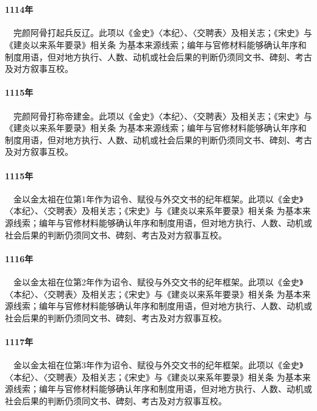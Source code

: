 \section{}

\paragraph{1114年}　完颜阿骨打起兵反辽。此项以《金史》〈本纪〉、〈交聘表〉及相关志；《宋史》与《建炎以来系年要录》相关条 为基本来源线索；编年与官修材料能够确认年序和制度用语，但对地方执行、人数、动机或社会后果的判断仍须同文书、碑刻、考古及对方叙事互校。

\paragraph{1115年}　完颜阿骨打称帝建金。此项以《金史》〈本纪〉、〈交聘表〉及相关志；《宋史》与《建炎以来系年要录》相关条 为基本来源线索；编年与官修材料能够确认年序和制度用语，但对地方执行、人数、动机或社会后果的判断仍须同文书、碑刻、考古及对方叙事互校。

\paragraph{1115年}　金以金太祖在位第1年作为诏令、赋役与外交文书的纪年框架。此项以《金史》〈本纪〉、〈交聘表〉及相关志；《宋史》与《建炎以来系年要录》相关条 为基本来源线索；编年与官修材料能够确认年序和制度用语，但对地方执行、人数、动机或社会后果的判断仍须同文书、碑刻、考古及对方叙事互校。

\paragraph{1116年}　金以金太祖在位第2年作为诏令、赋役与外交文书的纪年框架。此项以《金史》〈本纪〉、〈交聘表〉及相关志；《宋史》与《建炎以来系年要录》相关条 为基本来源线索；编年与官修材料能够确认年序和制度用语，但对地方执行、人数、动机或社会后果的判断仍须同文书、碑刻、考古及对方叙事互校。

\paragraph{1117年}　金以金太祖在位第3年作为诏令、赋役与外交文书的纪年框架。此项以《金史》〈本纪〉、〈交聘表〉及相关志；《宋史》与《建炎以来系年要录》相关条 为基本来源线索；编年与官修材料能够确认年序和制度用语，但对地方执行、人数、动机或社会后果的判断仍须同文书、碑刻、考古及对方叙事互校。

